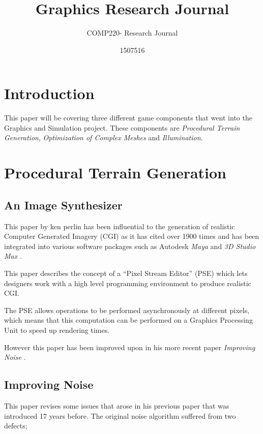 \documentclass{scrartcl}
\title{Graphics Research Journal}
\subtitle{COMP220- Research Journal}
\author{1507516}
\begin{document}
\maketitle

\abstract{}

\section{Introduction}
This paper will be covering three different game components that went into the Graphics and Simulation project. 
These components are \textit{Procedural Terrain Generation}, \textit{Optimization of Complex Meshes} and \textit{Illumination}.


\section{Procedural Terrain Generation}

\subsection{An Image Synthesizer \cite{perlin1985image}}
\par

This paper by ken perlin has been influential to the generation of realistic Computer Generated Imagery (CGI) as it has cited over 1900 times and has been integrated into various software packages such as Autodesk \textit{Maya} and \textit{3D Studio Max} \cite{PerlinWebsite}.
\par

This paper describes the concept of a ``Pixel Stream Editor'' (PSE) which lets designers work with a high level programming environment to produce realistic CGI.

The PSE allows operations to be performed asynchronously at different pixels, which means that this computation can be performed on a Graphics Processing Unit to speed up rendering times.

However this paper has been improved upon in his more recent paper \textit{Improving Noise} \cite{perlin2002improving}.


\subsection{Improving Noise \cite{perlin2002improving}}
This paper revises some issues that arose in his previous paper that was introduced 17 years before. 
The original noise algorithm suffered from two defects; 
\end{document}
